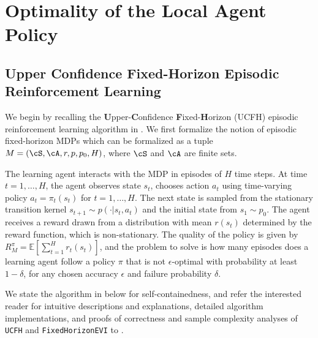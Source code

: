 \documentclass{article}
\theoremstyle{plain}
\theoremstyle{definition}
\def\E{\mathbb{E}}
\begin{document}
\newpage

\section{Optimality of the Local Agent Policy}
\label{sec: optimality of the local agent policy}
\subsection{Upper Confidence Fixed-Horizon Episodic Reinforcement Learning}

We begin by recalling the \textbf{U}pper-\textbf{C}onfidence \textbf{F}ixed-\textbf{H}orizon (UCFH) episodic reinforcement learning algorithm in \citet{dann2015sample}. We first formalize the notion of episodic fixed-horizon MDPs which can be formalized as a tuple $M=(\cS,\cA, r, p, p_0, H)$, where $\cS$ and $\cA$ are finite sets. 


The learning agent interacts with the MDP in episodes of $H$ time steps. At time $t=1,\dots,H$, the agent observes state $s_t$, chooses action $a_t$ using time-varying policy $a_t = \pi_t(s_t)$ for $t=1,\dots, H$. The next state is sampled from the stationary transition kernel $s_{t+1}\sim p(\cdot|s_t,a_t)$ and the initial state from $s_1\sim p_0$. The agent receives a reward drawn from a distribution with mean $r(s_t)$ determined by the reward function, which is non-stationary. The quality of the policy is given by $R_M^\pi = \E[\sum_{t=1}^H r_t(s_t)]$, and the problem to solve is how many episodes does a learning agent follow a policy $\pi$ that is not $\epsilon$-optimal with probability at least $1-\delta$, for any chosen accuracy $\epsilon$ and failure probability $\delta$.

We state the algorithm in \citet{dann2015sample} below for self-containedness, and refer the interested reader for intuitive descriptions and explanations, detailed algorithm implementations, and proofs of correctness and sample complexity analyses of \texttt{UCFH} and \texttt{FixedHorizonEVI} to  \citet{dann2015sample}.\\
\end{document}
